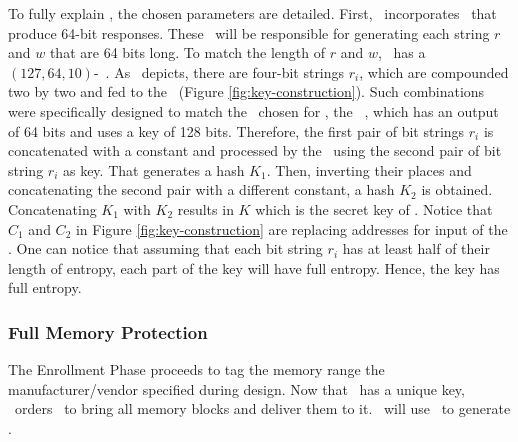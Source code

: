 To fully explain \fenroll, the chosen parameters are detailed. First, \cshia~incorporates \pufs~that produce 64-bit responses. These \pufs~will be responsible for generating each string $r$ and $w$ that are 64 bits long. To match the length of $r$ and $w$, \cshia~has a $(127, 64, 10)$-\bch~\ecc. As \fenroll~depicts, there are four-bit strings $r_i$, which are compounded two by two and fed to the \prf~(Figure \ref{fig:key-construction}). Such combinations were specifically designed to match the \prf~chosen for \cshia, the \siphash~\cite{Aumasson2012:SipHash}, which has an output of 64 bits and uses a key of 128 bits. Therefore, the first pair of bit strings $r_i$ is concatenated with a constant and processed by the \prf~using the second pair of bit string $r_i$ as key. That generates a hash $K_1$. Then, inverting their places and concatenating the second pair with a different constant, a hash $K_2$ is obtained. Concatenating $K_1$ with $K_2$ results in $K$ which is the secret key of \cshia. Notice that $C_1$ and $C_2$ in Figure \ref{fig:key-construction} are replacing addresses for input of the \ptaggen. One can notice that assuming that each bit string $r_i$ has at least half of their length of entropy, each part of the key will have full entropy. Hence, the key has full entropy. 

\subsubsection{Full Memory Protection}
\label{subsubsec:Full-Memory-Protection}

The Enrollment Phase proceeds to tag the memory range the manufacturer\slash{}vendor specified during design. Now that \ptaggen~has a unique key, \seceng~orders \handler~to bring all memory blocks and deliver them to it. \seceng~will use \ptaggen~to generate \ptags.%



